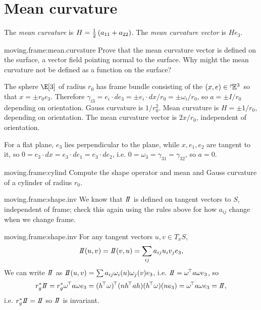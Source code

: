 \section{Mean curvature}
The \emph{mean curvature} is \(H=\frac{1}{2}\left(a_{11}+a_{22}\right)\).
The \emph{mean curvature vector} is \(He_3\).
\begin{problem}{moving.frame:mean.curvature}
Prove that the mean curvature vector is defined on the surface, a vector field pointing normal to the surface.
Why might the mean curvature not be defined as a function on the surface?
\end{problem}
\begin{example} 
The sphere \(\E[3]\) of radius \(r_0\) has frame bundle consisting of the \((x,e) \in \left\ulcorner\!\mathbb{E}^{3}\right.\) so that \(x=\pm r_0 e_3\).
Therefore \(\gamma_{i3} = e_i \cdot de_3=\pm e_i \cdot dx/r_0 = \pm \omega_i/r_0\), so \(a=\pm I/r_0\) depending on orientation.
Gauss curvature is \(1/r_0^2\).
Mean curvature is \(H=\pm 1/r_0\), depending on orientation.
The mean curvature vector is \(2x/r_0\), independent of orientation.
\end{example}
\begin{example}
For a flat plane, \(e_3\) lies perpendicular to the plane, while \(x, e_1, e_2\) are tangent to it, so \(0=e_3 \cdot dx = e_3 \cdot de_1 = e_3 \cdot de_2\), i.e. \(0=\omega_3=\gamma_{31} = \gamma_{32}\), so \(a=0\).
\end{example}
\begin{problem}{moving.frame:cylind}
Compute the shape operator and mean and Gauss curvature of a cylinder of radius \(r_0\).
\end{problem}
\begin{problem}{moving.frame:shape.inv}
We know that \(\shapeOp\) is defined on tangent vectors to \(S\), independent of frame; check this again using the rules above for how \(a_{ij}\) change when we change frame.
\end{problem}
\begin{answer}{moving.frame:shape.inv}
For any tangent vectors \(u,v \in T_x S\),
\[
\shapeOp(u,v)=\shapeOp(v,u)=\sum_{ij} a_{ij} u_i v_j e_3,
\]
We can write \(\shapeOp\) as \(\shapeOp(u,v)=\sum a_{ij} \omega_i(u) \omega_j(v)e_3\), i.e. \(\shapeOp=\transpose{\omega} a \omega e_3\), so 
\[
r_g^* \shapeOp = r_g^* \transpose{\omega} a \omega e_3 = \transpose{(\transpose{h}\omega)}(n \transpose{h} a h) (\transpose{h} \omega) (ne_3) = \transpose{\omega} a\omega e_3 = \shapeOp,
\]
i.e. \(r_g^* \shapeOp = \shapeOp\) so \(\shapeOp\) is invariant.
\end{answer}

